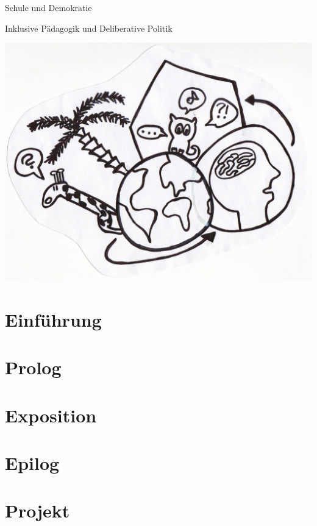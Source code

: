 \documentclass{dsa-latex/newlayout}
\begin{document}
 \setcounter{page}{3}

\setcounter{tocdepth}{1}
 \tableofcontents

   \setcounter{secnumdepth}{1}

\setcounter{page}{7}
\setcounter{chapter}{0}


 \begin{coursetitle}
   \centerline{Schule und Demokratie}
   \bigskip
   \Large \centerline{Inklusive Pädagogik und Deliberative Politik}
   \bigskip
  \includegraphics[width=.9\columnwidth]{img/kurslogo.jpg}
  \label{fig:meinbild}
   \bigskip
\end{coursetitle}

\section{Einführung}
	
\section{Prolog}
	
\section{Exposition}
	
	
	
	
	
	
	
	
\section{Epilog}
	
\section{Projekt}
	
	
	
	


\printbibliography
\end{document}
